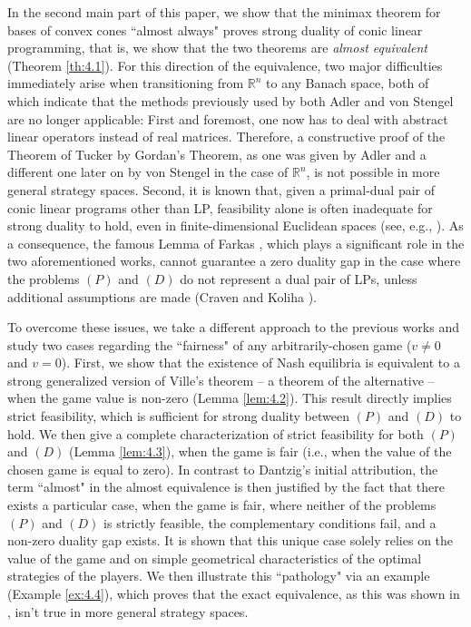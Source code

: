 \documentclass[11pt, twoside]{article}
\numberwithin{equation}{section}
\theoremstyle{definition}
\begin{document}
In the second main part of this paper, we show that the minimax theorem for bases of convex cones ``almost always" proves strong duality of conic linear programming, that is, we show that the two theorems are \textit{almost equivalent} (Theorem \ref{th:4.1}). For this direction of the equivalence, two major difficulties immediately arise when transitioning from $\mathbb{R}^n$ to any Banach space, both of which indicate that the methods previously used by both Adler \cite{adler2013equivalence} and von Stengel \cite{von2024zero} are no longer applicable: First and foremost, one now has to deal with abstract linear operators instead of real matrices. Therefore, a constructive proof of the Theorem of Tucker by Gordan's Theorem, as one was given by Adler \cite[Theorem 13]{adler2013equivalence} and a different one later on by von Stengel \cite[Theorem 6]{von2024zero} in the case of $\mathbb{R}^n$, is not possible in more general strategy spaces. Second, it is known that, given a primal-dual pair of conic linear programs other than LP, feasibility alone is often inadequate for strong duality to hold, even in finite-dimensional Euclidean spaces (see, e.g., \cite[Example 4.1.2]{wolkowicz2012handbook}). As a consequence, the famous Lemma of Farkas \cite[Proposition 1]{von2024zero}, which plays a significant role in the two aforementioned works, cannot guarantee a zero duality gap in the case where the problems \hyperlink{primal}{$(P)$} and \hyperlink{dual}{$(D)$} do not represent a dual pair of LPs, unless additional assumptions are made (Craven and Koliha \cite{craven1977generalizations}).\par

To overcome these issues, we take a different approach to the previous works \cite{adler2013equivalence,  dantzig1951proof, ickstadt2024semidefinite, von2024zero} and study two cases regarding the ``fairness" of any arbitrarily-chosen game ($v\neq0$ and $v=0$). First, we show that the existence of Nash equilibria is equivalent to a strong generalized version of Ville's theorem \cite{ville1938theorie} -- a theorem of the alternative -- when the game value is non-zero (Lemma \ref{lem:4.2}). This result directly implies strict feasibility, which is sufficient for strong duality between \hyperlink{primal}{$(P)$} and \hyperlink{dual}{$(D)$} to hold. We then give a complete characterization of strict feasibility for both \hyperlink{primal}{$(P)$} and \hyperlink{dual}{$(D)$} (Lemma \ref{lem:4.3}), when the game is fair (i.e., when the value of the chosen game is equal to zero). In contrast to Dantzig's initial attribution, the term ``almost" in the almost equivalence is then justified by the fact that there exists a particular case, when the game is fair, where neither of the problems \hyperlink{primal}{$(P)$} and \hyperlink{dual}{$(D)$} is strictly feasible, the complementary conditions fail, and a non-zero duality gap exists. It is shown that this unique case solely relies on the value of the game and on simple geometrical characteristics of the optimal strategies of the players. We then illustrate this ``pathology" via an example (Example \ref{ex:4.4}), which proves that the exact equivalence, as this was shown in \cite{adler2013equivalence, von2024zero}, isn't true in more general strategy spaces.\par
\end{document}
